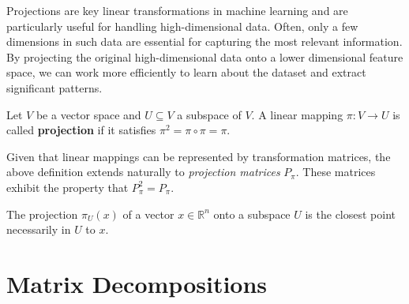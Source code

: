 \documentclass{article}
\begin{document}
Projections are key linear transformations in machine learning and are
particularly useful for handling high-dimensional data. Often, only a few
dimensions in such data are essential for capturing the most relevant
information. By projecting the original high-dimensional data onto a lower
dimensional feature space, we can work more efficiently to learn about the
dataset and extract significant patterns.
\begin{definition}
    Let $V$ be a vector space and $U\subseteq V$ a subspace of $V$. A linear
    mapping $\pi:V\to U$ is called \textbf{projection} if it satisfies
    $\pi^2=\pi\circ\pi=\pi$.
\end{definition}
Given that linear mappings can be represented by transformation matrices, the
above definition extends naturally to \textit{projection matrices} $P_{\pi}$.
These matrices exhibit the property that $P_{\pi}^2=P_{\pi}$.

The projection $\pi_U(x)$ of a vector $x\in \mathbb{R}^n$ onto a subspace $U$
is the closest point necessarily in $U$ to $x$.
\cleardoublepage
\section{Matrix Decompositions}
\end{document}
